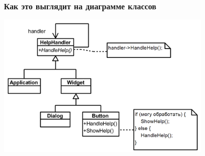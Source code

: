 \documentclass{../../slides-style}
\begin{document}
    \begin{frame}
        \frametitle{Как это выглядит на диаграмме классов}
        \begin{center}
            \includegraphics[width=0.8\textwidth]{chainOfResponsibilityExampleClasses.png}
        \end{center}
    \end{frame}
\end{document}
